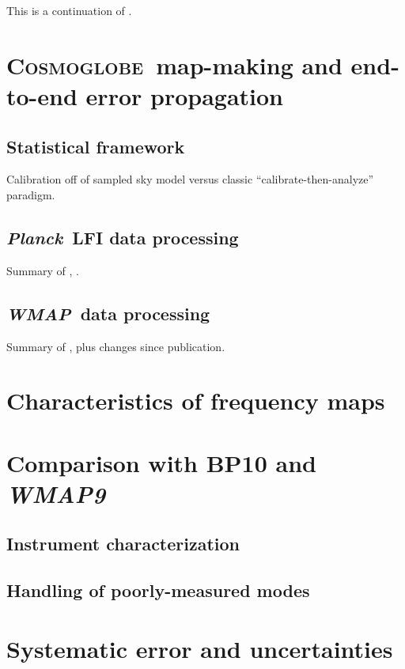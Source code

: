 \documentclass[twocolumn]{../../common/aa}
\def\wmap{\emph{WMAP}}
\def\planck{\emph{Planck}}
\newcommand{\cosmoglobe}{\textsc{Cosmoglobe}}
\begin{document}
This is a continuation of \citet{bp17}.


\section{\cosmoglobe\ map-making and end-to-end error propagation}

\subsection{Statistical framework}

Calibration off of sampled sky model versus classic ``calibrate-then-analyze'' paradigm.

\subsection{\planck\ LFI data processing}

Summary of \citet{bp01}, \citet{bp10}.

\subsection{\wmap\ data processing}

Summary of \citet{bp17}, plus changes since publication.

\section{Characteristics of frequency maps}

\section{Comparison with BP10 and \textit{WMAP9}}

\subsection{Instrument characterization}

\subsection{Handling of poorly-measured modes}


\section{Systematic error and uncertainties}
\end{document}

